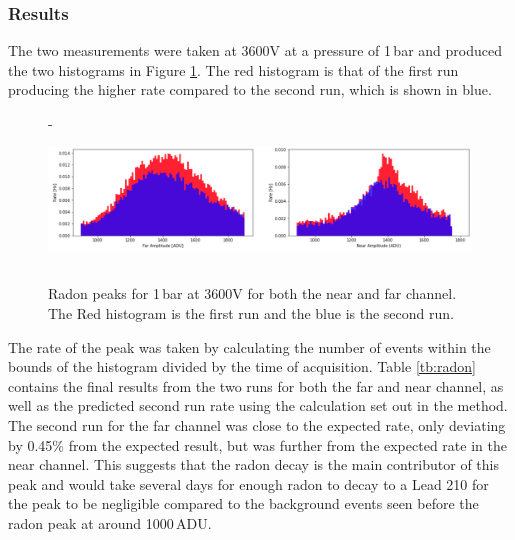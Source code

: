 \documentclass[a4paper]{article}
\begin{document}
\subsubsection{Results}
The two measurements were taken at 3600V at a pressure of 1\,bar and produced the two histograms in Figure \ref{fig:radon}. The red histogram is that of the first run producing the higher rate compared to the second run, which is shown in blue. 
\begin{figure}[H]-
    \centering
    \includegraphics[height=3.5cm]{plots/radon.png}
    \caption{Radon peaks for 1\,bar at 3600V for both the near and far channel. The Red histogram is the first run and the blue is the second run.}
    \label{fig:radon}
\end{figure}
\noindent The rate of the peak was taken by calculating the number of events within the bounds of the histogram divided by the time of acquisition. Table \ref{tb:radon} contains the final results from the two runs for both the far and near channel, as well as the predicted second run rate using the calculation set out in the method. The second run for the far channel was close to the expected rate, only deviating by 0.45\% from the expected result, but was further from the expected rate in the near channel. This suggests that the radon decay is the main contributor of this peak and would take several days for enough radon to decay to a Lead 210 for the peak to be negligible compared to the background events seen before the radon peak at around 1000\,ADU.
\end{document}
